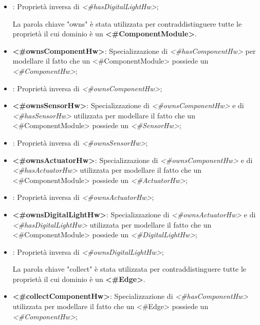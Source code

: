 \begin{itemize}
	\item {}: Proprietà inversa di \textit{<\#hasDigitalLightHw>};

\begin{info}[owns:]
	La parola chiave "owns" è stata utilizzata per contraddistinguere tutte le proprietà il cui dominio è un \textbf{<\#ComponentModule>}.
\end{info}

	\item \textbf{<\#ownsComponentHw>}: Specializzazione di \textit{<\#hasComponentHw>} per modellare il fatto che un <\#ComponentModule> possiede un \textit{<\#ComponentHw>};

	\item {}: Proprietà inversa di \textit{<\#ownsComponentHw>};

	\item \textbf{<\#ownsSensorHw>}: Specializzazione di \textit{<\#ownsComponentHw>} e di \textit{<\#hasSensorHw>} utilizzata per modellare il fatto che un <\#ComponentModule> possiede un \textit{<\#SensorHw>};

	\item {}: Proprietà inversa di \textit{<\#ownsSensorHw>};

	\item \textbf{<\#ownsActuatorHw>}: Specializzazione di \textit{<\#ownsComponentHw>} e di \textit{<\#hasActuatorHw>} utilizzata per modellare il fatto che un <\#ComponentModule> possiede un \textit{<\#ActuatorHw>};

	\item {}: Proprietà inversa di \textit{<\#ownsActuatorHw>};

	\item \textbf{<\#ownsDigitalLightHw>}: Specializzazione di \textit{<\#ownsActuatorHw>} e di \textit{<\#hasDigitalLightHw>} utilizzata per modellare il fatto che un <\#ComponentModule> possiede un \textit{<\#DigitalLightHw>};

	\item {}: Proprietà inversa di \textit{<\#ownsDigitalLightHw>};

\begin{info}[collect:]
	La parola chiave "collect" è stata utilizzata per contraddistinguere tutte le proprietà il cui dominio è un \textbf{<\#Edge>}.
\end{info}

	\item \textbf{<\#collectComponentHw>}: Specializzazione di \textit{<\#hasComponentHw>} utilizzata per modellare il fatto che un <\#Edge> possiede un \textit{<\#ComponentHw>};


\end{itemize}
